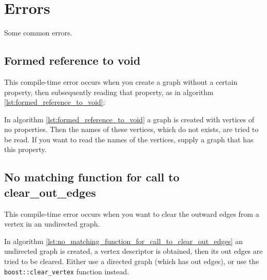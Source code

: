 \chapter{Errors}

Some common errors.

\section{Formed reference to void}
\label{subsec:formed_reference_to_void}

This compile-time error occurs when you create a graph without a certain
 property, then subsequently reading that property, as in algorithm 
\ref{lst:formed_reference_to_void}: 



In algorithm \ref{lst:formed_reference_to_void}
a graph is created with vertices of no properties.
Then the names of these vertices, which do not exists, are tried to be
read.
If you want to read the names of the vertices, supply a graph that has
this property.

\section{No matching function for call to clear\_out\_edges}
\label{subsec:no_matching_function_for_call_to_clear_out_edges}

This compile-time error occurs when you want to clear the outward edges
from a vertex in an undirected graph.



In algorithm 
\ref{lst:no_matching_function_for_call_to_clear_out_edges}
an undirected graph is created, a vertex descriptor is obtained, then its
out
edges are tried to be cleared. Either use a directed graph (which has out
edges), or use the \verb;boost::clear_vertex; function instead.

